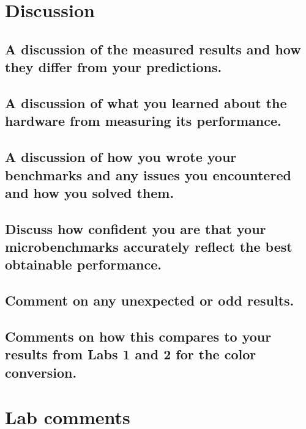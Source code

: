 \documentclass{article}
\begin{document}
\section{Discussion}

\subsection{A discussion of the measured results and how they differ
  from your predictions.}


\subsection{A discussion of what you learned about the hardware from measuring its performance.}

\subsection{A discussion of how you wrote your benchmarks and any issues you encountered and how you solved them.}



\subsection{Discuss how confident you are that your microbenchmarks accurately reflect the best obtainable performance.}

\subsection{Comment on any unexpected or odd results.}

\subsection{Comments on how this compares to your results from Labs 1 and 2 for the color conversion.}


\section{Lab comments}
\end{document}
